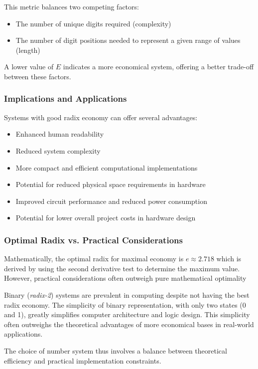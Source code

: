 \documentclass[12pt]{report}
\begin{document}
This metric balances two competing factors:
\begin{itemize}
	\item The number of unique digits required (complexity)
	\item The number of digit positions needed to represent a given range of values (length)
\end{itemize}

A lower value of $E$ indicates a more economical system, offering a better trade-off between these factors.

\subsubsection*{Implications and Applications}
Systems with good radix economy can offer several advantages:
\begin{itemize}
	\item Enhanced human readability
	\item Reduced system complexity
	\item More compact and efficient computational implementations
	\item Potential for reduced physical space requirements in hardware
	\item Improved circuit performance and reduced power consumption
	\item Potential for lower overall project costs in hardware design
\end{itemize}
\subsubsection*{Optimal Radix vs. Practical Considerations}

Mathematically, the optimal radix for maximal economy is $e \approx 2.718$ which is derived by using the second derivative test to determine the maximum value. However, practical considerations often outweigh pure mathematical optimality

Binary (\textit{radix-2}) systems are prevalent in computing despite not having the best radix economy. The simplicity of binary representation, with only two states (0 and 1), greatly simplifies computer architecture and logic design. This simplicity often outweighs the theoretical advantages of more economical bases in real-world applications.

The choice of number system thus involves a balance between theoretical efficiency and practical implementation constraints.
\end{document}
